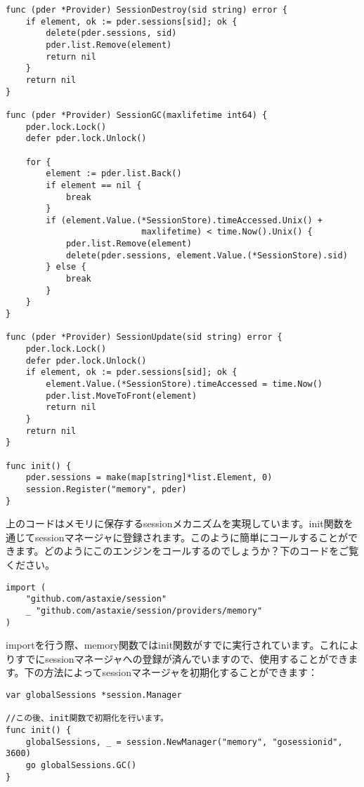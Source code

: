 \begin{lstlisting}[numbers=none]
func (pder *Provider) SessionDestroy(sid string) error {
    if element, ok := pder.sessions[sid]; ok {
        delete(pder.sessions, sid)
        pder.list.Remove(element)
        return nil
    }
    return nil
}

func (pder *Provider) SessionGC(maxlifetime int64) {
    pder.lock.Lock()
    defer pder.lock.Unlock()

    for {
        element := pder.list.Back()
        if element == nil {
            break
        }
        if (element.Value.(*SessionStore).timeAccessed.Unix() +
                           maxlifetime) < time.Now().Unix() {
            pder.list.Remove(element)
            delete(pder.sessions, element.Value.(*SessionStore).sid)
        } else {
            break
        }
    }
}

func (pder *Provider) SessionUpdate(sid string) error {
    pder.lock.Lock()
    defer pder.lock.Unlock()
    if element, ok := pder.sessions[sid]; ok {
        element.Value.(*SessionStore).timeAccessed = time.Now()
        pder.list.MoveToFront(element)
        return nil
    }
    return nil
}

func init() {
    pder.sessions = make(map[string]*list.Element, 0)
    session.Register("memory", pder)
}
\end{lstlisting}

上のコードはメモリに保存するsessionメカニズムを実現しています。init関数を通じてsessionマネージャに登録されます。このように簡単にコールすることができます。どのようにこのエンジンをコールするのでしょうか？下のコードをご覧ください。


\begin{lstlisting}[numbers=none]
import (
    "github.com/astaxie/session"
    _ "github.com/astaxie/session/providers/memory"
)
\end{lstlisting}

importを行う際、memory関数ではinit関数がすでに実行されています。これによりすでにsessionマネージャへの登録が済んでいますので、使用することができます。下の方法によってsessionマネージャを初期化することができます：

\begin{lstlisting}[numbers=none]
var globalSessions *session.Manager

//この後、init関数で初期化を行います。
func init() {
    globalSessions, _ = session.NewManager("memory", "gosessionid", 3600)
    go globalSessions.GC()
}
\end{lstlisting}


